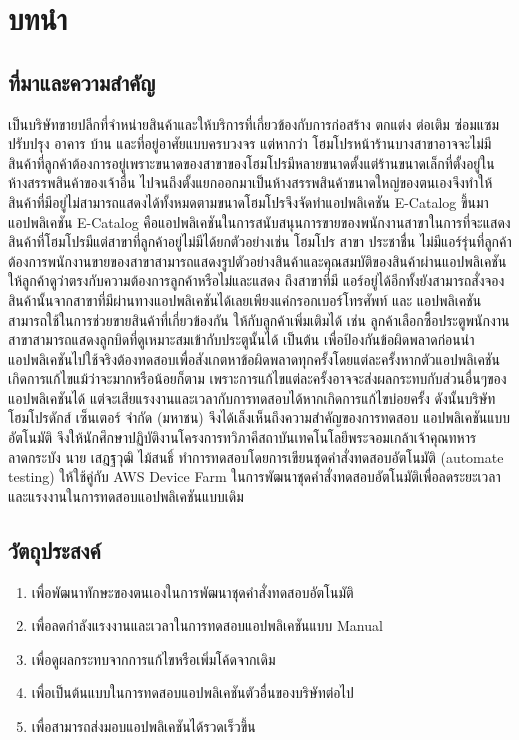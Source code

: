 \chapter{บทนำ}
\thispagestyle{empty}
\label{chapter:introduction}

\section{ที่มาและความสำคัญ}
    {\Company} เป็นบริษัทขายปลีกที่จำหน่ายสินค้าและให้บริการที่เกี่ยวข้องกับการก่อสร้าง ตกแต่ง ต่อเติม ซ่อมแซม ปรับปรุง อาคาร บ้าน และที่อยู่อาศัยแบบครบวงจร
    แต่หากว่า โฮมโปรหน้าร้านบางสาขาอาจจะไม่มีสินค้าที่ลูกค้าต้องการอยู่เพราะขนาดของสาขาของโฮมโปรมีหลายขนาดตั้งแต่ร้านขนาดเล็กที่ตั้งอยู่ในห้างสรรพสินค้าของเจ้าอื่น
    ไปจนถึงตั้งแยกออกมาเป็นห้างสรรพสินค้าขนาดใหญ่ของตนเองจึงทำให้สินค้าที่มีอยู่ไม่สามารถแสดงได้ทั้งหมดตามขนาดโฮมโปรจึงจัดทำแอปพลิเคชัน E-Catalog ขึ้นมา
    แอปพลิเคชัน E-Catalog คือแอปพลิเคชันในการสนับสนุนการขายของพนักงานสาขาในการที่จะแสดงสินค้าที่โฮมโปรมีแต่สาขาที่ลูกค้าอยู่ไม่มีได้ยกตัวอย่างเช่น โฮมโปร
    สาขา ประชาชื่น ไม่มีแอร์รุ่นที่ลูกค้าต้องการพนักงานขายของสาขาสามารถแสดงรูปตัวอย่างสินค้าและคุณสมบัติของสินค้าผ่านแอปพลิเคชันให้ลูกค้าดูว่าตรงกับความต้องการลูกค้าหรือไม่และแสดง
    ถึงสาขาที่มี แอร์อยู่ได้อีกทั้งยังสามารถสั่งจองสินค้านั้นจากสาขาที่มีผ่านทางแอปพลิเคชันได้เลยเพียงแค่กรอกเบอร์โทรศัพท์ และ แอปพลิเคชันสามารถใช้ในการช่วยขายสินค้าที่เกี่ยวข้องกัน
    ให้กับลูกค้าเพิ่มเติมได้ เช่น ลูกค้าเลือกซื้อประตูพนักงานสาขาสามารถแสดงลูกบิดที่ดูเหมาะสมเข้ากับประตูนั้นได้ เป็นต้น
    เพื่อป้องกันข้อผิดพลาดก่อนนำแอปพลิเคชันไปใช้จริงต้องทดสอบเพื่อสังเกตหาข้อผิดพลาดทุกครั้งโดยแต่ละครั้งหากตัวแอปพลิเคชันเกิดการแก้ไขแม้ว่าจะมากหรือน้อยก็ตาม
    เพราะการแก้ไขแต่ละครั้งอาจจะส่งผลกระทบกับส่วนอื่นๆของแอปพลิเคชันได้ แต่จะเสียแรงงานและเวลากับการทดสอบได้หากเกิดการแก้ไขบ่อยครั้ง
    ดังนั้นบริษัท โฮมโปรดักส์ เซ็นเตอร์ จํากัด (มหาชน) จึงได้เล็งเห็นถึงความสําคัญของการทดสอบ
    แอปพลิเคชันแบบอัตโนมัติ จึงให้นักศึกษาปฏิบัติงานโครงการทวิภาคีสถาบันเทคโนโลยีพระจอมเกล้าเจ้าคุณทหารลาดกระบัง นาย เสฎฐวุฒิ ไม้สนธิ์ ทำการทดสอบโดยการเขียนชุดคำสั่งทดสอบอัตโนมัติ (automate testing) ให้ใช้คู่กับ AWS Device Farm
    ในการพัฒนาชุดคำสั่งทดสอบอัตโนมัติเพื่อลดระยะเวลาและแรงงานในการทดสอบแอปพลิเคชันแบบเดิม

\section{วัตถุประสงค์}
    \begin{enumerate}
        \item เพื่อพัฒนาทักษะของตนเองในการพัฒนาชุดคำสั่งทดสอบอัตโนมัติ
        \item เพื่อลดกำลังแรงงานและเวลาในการทดสอบแอปพลิเคชันแบบ Manual
        \item เพื่อดูผลกระทบจากการแก้ไขหรือเพิ่มโค้ดจากเดิม
        \item เพื่อเป็นต้นแบบในการทดสอบแอปพลิเคชันตัวอื่นของบริษัทต่อไป
        \item เพื่อสามารถส่งมอบแอปพลิเคชันได้รวดเร็วขึ้น
    \end{enumerate}

